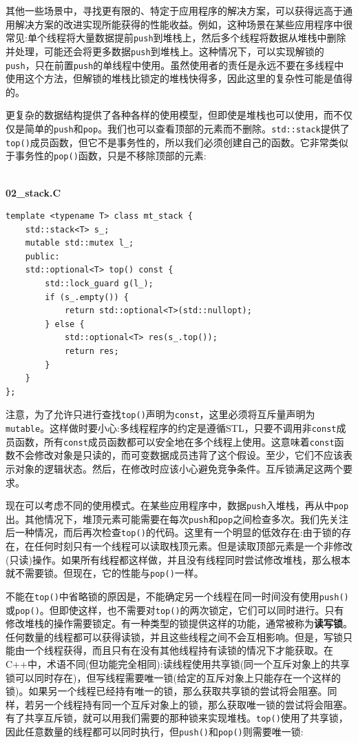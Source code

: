 其他一些场景中，寻找更有限的、特定于应用程序的解决方案，可以获得远高于通用解决方案的改进实现所能获得的性能收益。例如，这种场景在某些应用程序中很常见:单个线程将大量数据提前\texttt{push}到堆栈上，然后多个线程将数据从堆栈中删除并处理，可能还会将更多数据\texttt{push}到堆栈上。这种情况下，可以实现解锁的\texttt{push}，只在前置\texttt{push}的单线程中使用。虽然使用者的责任是永远不要在多线程中使用这个方法，但解锁的堆栈比锁定的堆栈快得多，因此这里的复杂性可能是值得的。

更复杂的数据结构提供了各种各样的使用模型，但即使是堆栈也可以使用，而不仅仅是简单的\texttt{push}和\texttt{pop}。我们也可以查看顶部的元素而不删除。\texttt{std::stack}提供了\texttt{top()}成员函数，但它不是事务性的，所以我们必须创建自己的函数。它非常类似于事务性的\texttt{pop()}函数，只是不移除顶部的元素:

\hspace*{\fill} \\ %
\noindent
\textbf{02\_stack.C}
\begin{lstlisting}[style=styleCXX]
template <typename T> class mt_stack {
	std::stack<T> s_;
	mutable std::mutex l_;
	public:
	std::optional<T> top() const {
		std::lock_guard g(l_);
		if (s_.empty()) {
			return std::optional<T>(std::nullopt);
		} else {
			std::optional<T> res(s_.top());
			return res;
		}
	}
};
\end{lstlisting}

注意，为了允许只进行查找\texttt{top()}声明为\texttt{const}，这里必须将互斥量声明为\texttt{mutable}。这样做时要小心:多线程程序的约定是遵循STL，只要不调用非\texttt{const}成员函数，所有\texttt{const}成员函数都可以安全地在多个线程上使用。这意味着\texttt{const}函数不会修改对象是只读的，而可变数据成员违背了这个假设。至少，它们不应该表示对象的逻辑状态。然后，在修改时应该小心避免竞争条件。互斥锁满足这两个要求。

现在可以考虑不同的使用模式。在某些应用程序中，数据\texttt{push}入堆栈，再从中\texttt{pop}出。其他情况下，堆顶元素可能需要在每次\texttt{push}和\texttt{pop}之间检查多次。我们先关注后一种情况，而后再次检查\texttt{top()}的代码。这里有一个明显的低效存在:由于锁的存在，在任何时刻只有一个线程可以读取栈顶元素。但是读取顶部元素是一个非修改(只读)操作。如果所有线程都这样做，并且没有线程同时尝试修改堆栈，那么根本就不需要锁。但现在，它的性能与\texttt{pop()}一样。

不能在\texttt{top()}中省略锁的原因是，不能确定另一个线程在同一时间没有使用\texttt{push()}或\texttt{pop()}。但即使这样，也不需要对\texttt{top()}的两次锁定，它们可以同时进行。只有修改堆栈的操作需要锁定。有一种类型的锁提供这样的功能，通常被称为\textbf{读写锁}。任何数量的线程都可以获得读锁，并且这些线程之间不会互相影响。但是，写锁只能由一个线程获得，而且只有在没有其他线程持有读锁的情况下才能获取。在C++中，术语不同(但功能完全相同):读线程使用共享锁(同一个互斥对象上的共享锁可以同时存在)，但写线程需要唯一锁(给定的互斥对象上只能存在一个这样的锁)。如果另一个线程已经持有唯一的锁，那么获取共享锁的尝试将会阻塞。同样，若另一个线程持有同一个互斥对象上的锁，那么获取唯一锁的尝试将会阻塞。有了共享互斥锁，就可以用我们需要的那种锁来实现堆栈。\texttt{top()}使用了共享锁，因此任意数量的线程都可以同时执行，但\texttt{push()}和\texttt{pop()}则需要唯一锁:

